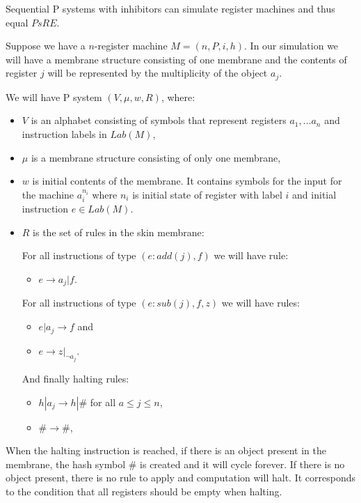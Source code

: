 \begin{veta}
  Sequential P systems with inhibitors can simulate register machines and thus equal $PsRE$.
\end{veta}


\begin{dokaz}
\label{proof:reg_by_inh}
  Suppose we have a $n$-register machine $M = (n,P,i,h)$. In our simulation we will have a membrane structure consisting of one membrane and the contents of register $j$ will be represented by the multiplicity of the object $a_j$.

  We will have P system $(V, \mu, w, R)$, where:
  \begin{itemize}
    \item $V$ is an alphabet consisting of symbols that represent registers $a_1,\dots a_n$ and instruction labels in $Lab(M)$,
    \item $\mu$ is a membrane structure consisting of only one membrane,
    \item $w$ is initial contents of the membrane. It contains symbols for the input for the machine $a_i^{n_i}$ where $n_i$ is initial state of register with label $i$ and initial instruction $e \in Lab(M)$.
    \item $R$ is the set of rules in the skin membrane:
    
    For all instructions of type $(e : add(j), f)$ we will have rule:
    \begin{itemize}
      \item $e \rightarrow a_j|f$.
    \end{itemize}
    
    For all instructions of type $(e : sub(j), f, z)$ we will have rules:
    \begin{itemize}
      \item $e|a_j \rightarrow f$ and
      \item $e \rightarrow z|_{\neg a_j}$.
    \end{itemize}

    And finally halting rules:
    \begin{itemize}
      \item $h|a_j \rightarrow h|\#$ for all $a\leq j\leq n$,
      \item $\# \rightarrow \#$,
    \end{itemize}
  \end{itemize}

  When the halting instruction is reached, if there is an object present in the membrane, the hash symbol $\#$ is created and it will cycle forever. If there is no object present, there is no rule to apply and computation will halt. It corresponds to the condition that all registers should be empty when halting.
\end{dokaz}
